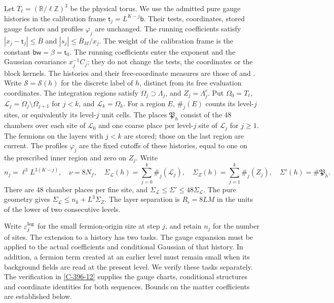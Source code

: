 \documentclass[11pt,letterpaper,reqno]{amsart}
\theoremstyle{definition}
\theoremstyle{remark}
\begin{document}
Let $T_\ell=(\mathbb R/\ell\mathbb Z)^3$ be the physical torus.
We use the admitted pure gauge histories in the calibration frame
$\mathsf t_j=L^{K-j}\mathsf b$. Their tests, coordinates, stored
gauge factors and profiles $\varphi_j$ are unchanged. The running
coefficients satisfy $|x_j-\mathsf t_j|\le\bar B$ and
$|s_j|\le\bar B_M/x_j$.
The weight of the calibration frame is the constant
$\mathsf{bw}=\beta=\mathsf t_0$. The running coefficients
enter the exponent and the Gaussian covariance $x_j^{-1}C_j$;
they do not change the tests, the coordinates or the block kernels.
The histories and their free-coordinate measures are those of
\cite[\S4.1]{YMM1} and \cite[Thm.~C]{YMM1}. Write $\mathcal S=\mathcal S(h)$
for the discrete label of $h$, distinct from its free evaluation
coordinates. The integration regions
satisfy $\Omega_j\supset\Lambda_j$, and $Z_j=\Lambda_j^c$.
Put $\Omega_0=T_\ell$,
$\mathcal L_j=\Omega_j\setminus\Omega_{j+1}$ for $j<k$,
and $\mathcal L_k=\Omega_k$.
For a region $E$, $\#_j(E)$ counts its level-$j$ sites, or
equivalently its level-$j$ unit cells. The places $\mathfrak P_h$
consist of the 48 chambers over each site of $\mathcal L_0$
and one coarse place per level-$j$ site of $\mathcal L_j$ for $j\ge1$.
The fermions on the layers with $j<k$ are stored; those on the
last region are current. The profiles $\varphi_j$ are the fixed
cutoffs of these histories, equal to one on the prescribed inner
region and zero on $Z_j$. Write
\[
 n_j=\ell^3L^{3(K-j)},\quad \nu=8N_f,\quad
 \Sigma_{\mathcal L}(h)=\sum_{j=0}^k\#_j(\mathcal L_j),\quad
 \Sigma_Z(h)=\sum_{j=1}^k\#_j(Z_j),\quad
 \Sigma'(h)=\#\mathfrak P_h.
\]
There are $48$ chamber places per fine site, and
$\Sigma_{\mathcal L}\le\Sigma'\le48\Sigma_{\mathcal L}$.
The pure geometry gives
$\Sigma_{\mathcal L}\le n_k+L^3\Sigma_Z$.
The layer separation is $R_\flat=8LM$ in the units of the lower
of two consecutive levels.

Write $\varepsilon_j^{\rm leg}$ for the small fermion-origin
size at step $j$, and retain $n_j$ for the number of sites.
The extension to a history has two tasks. The gauge expansion
must be applied to the actual coefficients and conditional
Gaussian of that history. In addition, a fermion term created
at an earlier level must remain small when its background
fields are read at the present level. We verify these tasks
separately. The verification in \cref{C-396-12} supplies the
gauge charts, conditional structures and coordinate identities
for both sequences. Bounds on the matter coefficients are
established below.
\end{document}
